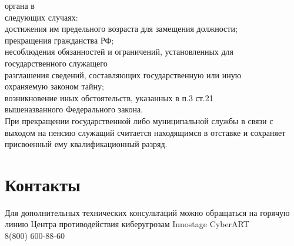 \documentclass[14pt,a4paper]{extarticle}
\begin{document}
органа в \\   \vspace{1em} следующих случаях: \\   \vspace{1em} достижения им предельного возраста для замещения должности; \\   \vspace{1em} прекращения гражданства РФ; \\   \vspace{1em} несоблюдения обязанностей и ограничений, установленных для \\   \vspace{1em} государственного служащего \\   \vspace{1em} разглашения сведений, составляющих государственную или иную \\   \vspace{1em} охраняемую законом тайну; \\   \vspace{1em} возникновение иных обстоятельств, указанных в п.3 ст.21 \\   \vspace{1em} вышеназванного Федерального закона. \\   \vspace{1em} При прекращении государственной либо муниципальной службы в связи
с \\   \vspace{1em} выходом на пенсию служащий считается находящимся в отставке и
сохраняет \\   \vspace{1em} присвоенный ему квалификационный разряд. \\   \vspace{1em}


\newpage
\section*{Контакты}
Для дополнительных технических консультаций можно обращаться на горячую линию Центра противодействия киберугрозам {\color{orange}Innostage} CyberART
\\
 \hspace{26pt} {8(800) 600-88-60}
\end{document}
